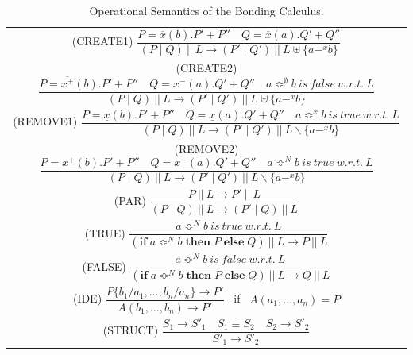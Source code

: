 \documentclass[runningheads]{llncs}
\begin{document}
\begin{table}[h]
\begin{center}
\begin{tabular}{c}
\vspace{1ex}
{\sf (CREATE1)} $\dfrac{P=\overline{x}(b).P'+P'' \quad Q= \overline{x}(a).Q'+Q''}{(P\mid Q)\ || \ L \xrightarrow{} (P' \mid Q') \ ||\ L \uplus \{a-^x b\}}$\\
\vspace{1ex}
{\sf (CREATE2)} $\dfrac{P=\overline{x^+}(b).P'+P'' \quad Q= \overline{x^-}(a).Q'+Q''\quad a \Bumpeq^{\emptyset} b~is~false~w.r.t.~L}{(P\mid Q)\ || \ L \xrightarrow{} (P' \mid Q') \ ||\ L \uplus \{a-^x b\}}$\\
\vspace{1ex}
{\sf (REMOVE1)} $\dfrac{P=\underline{x}(b).P'+P'' \quad Q= \underline{x}(a).Q'+Q'' \quad a \Bumpeq^x b~is~true~w.r.t.~L }{(P\mid Q)\ || \ L \xrightarrow{} (P' \mid Q') \ || \ L \backslash \{a-^x b\}}$\\
\vspace{1ex}
{\sf (REMOVE2)} $\dfrac{P=\underline{x^+}(b).P'+P'' \quad Q= \underline{x^-}(a).Q'+Q'' \quad a \Bumpeq^N b~is~true~w.r.t.~L }{(P\mid Q)\ || \ L \xrightarrow{} (P' \mid Q') \ || \ L \backslash \{a-^x b\}}$\\
\vspace{1ex}
{\sf (PAR)} $ \dfrac{P\ || \ L\xrightarrow{} P'\ || \ L}{(P\mid Q)\ || \ L\xrightarrow{} (P' \mid Q) \ || \ L}$\\
\vspace{1ex}
{\sf (TRUE)} $\dfrac{a \Bumpeq^N b~is~true~w.r.t.~L}{(\textbf{if}\;a \Bumpeq^N b \;\textbf{then}\;P\;\textbf{else}\;
Q)\ || \ L  \xrightarrow{} P\ || \ L}$\\
\vspace{1ex}
{\sf (FALSE)} $\dfrac{a \Bumpeq^N b~is~false~w.r.t.~L}{(\textbf{if}\;a \Bumpeq^N b \;\textbf{then}\;P\;\textbf{else}\;
Q)\ || \ L  \xrightarrow{} Q\ || \ L}$\\

\vspace{1ex}
{\sf (IDE)} $\dfrac{P\{b_1/a_1,\ldots,b_n/a_n\} \xrightarrow{} P'}{A(b_1,\ldots,b_n) \xrightarrow{} P'}$ \ if \ $A(a_1,\ldots,a_n) =P$\\

{\sf (STRUCT)} $\dfrac{S_1 \rightarrow S'_1 \quad S_1 \equiv S_2 \quad S_2 \rightarrow S'_2}{S'_1 \rightarrow S'_2}$

\end{tabular}
\end{center}
  \vspace{-2ex}\caption{Operational Semantics of the Bonding Calculus.}
  \label{table:semantics}
\vspace{-3ex}
\end{table}
\end{document}
